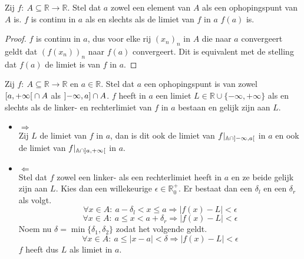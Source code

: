 \documentclass[main.tex]{subfiles}
\begin{document}
\begin{bpr}
  \label{pr:functie-continu-asa-limiet-is-beeld}
  Zij $f:\ A \subseteq \mathbb{R} \rightarrow \mathbb{R}$.
  Stel dat $a$ zowel een element van $A$ als een ophopingspunt van $A$ is.
  $f$ is continu in $a$ als en slechts als de limiet van $f$ in $a$ $f(a)$ is.

  \begin{proof}
    $f$ is continu in $a$, dus voor elke rij $(x_{n})_{n}$ in $A$ die naar $a$ convergeert geldt dat $(f(x_{n}))_{n}$ naar $f(a)$ convergeert.
    Dit is equivalent met de stelling dat $f(a)$ de limiet is van $f$ in $a$.
  \end{proof}
\end{bpr}

\begin{bpr}
  Zij $f:\ A \subseteq \mathbb{R} \rightarrow \mathbb{R}$ en $a\in \mathbb{R}$.
  Stel dat $a$ een ophopingspunt is van zowel $\interval[open right]{a}{+\infty} \cap A$ als $\interval[open left]{-\infty}{a} \cap A$.
  $f$ heeft in $a$ een limiet $L\in \mathbb{R}\cup \{ -\infty,+\infty\}$ als en slechts als de linker- en rechterlimiet van $f$ in $a$ bestaan en gelijk zijn aan $L$.

  \begin{itemize}
  \item $\Rightarrow$\\
    Zij $L$ de limiet van $f$ in $a$, dan is dit ook de limiet van $f|_{\mathbb{A} \cap \interval[open]{-\infty}{a}}$ in $a$ en ook de limiet van $f|_{\mathbb{A} \cap \interval[open]{a}{+\infty}}$ in $a$.
  \item $\Leftarrow$\\
    Stel dat $f$ zowel een linker- als een rechterlimiet heeft in $a$ en ze beide gelijk zijn aan $L$.
    Kies dan een willekeurige $\epsilon\in\mathbb{R}_{0}^{+}$.
    Er bestaat dan een $\delta_{l}$ en een $\delta_{r}$ als volgt.
    \[ \forall x\in A:\ a-\delta_{l}<x\le a \Rightarrow |f(x)-L|<\epsilon \]
    \[ \forall x\in A:\ a\le x < a+\delta_{r} \Rightarrow |f(x)-L|<\epsilon \]
    Noem nu $\delta = \min\{\delta_{1},\delta_{2}\}$ zodat het volgende geldt.
    \[ \forall x\in A:\ a\le |x-a|<\delta \Rightarrow |f(x)-L|<\epsilon \]
    $f$ heeft dus $L$ als limiet in $a$.
  \end{itemize}
\end{bpr}
\end{document}
